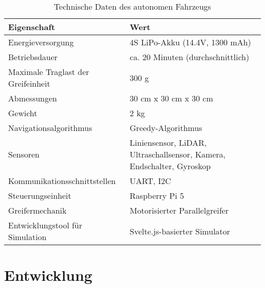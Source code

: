 \documentclass[main.tex]{subfiles} %
\begin{document}
\begin{table}[H]
    \centering
    \renewcommand{\arraystretch}{1.5}
    \begin{tabular}{|l|p{7cm}|}
        \hline
        \textbf{Eigenschaft}               & \textbf{Wert}                                                             \\ \hline
        Energieversorgung                  & 4S LiPo-Akku (14.4V, 1300 mAh)                                            \\ \hline
        Betriebsdauer                      & ca. 20 Minuten (durchschnittlich)                                         \\ \hline
        Maximale Traglast der Greifeinheit & 300 g                                                                     \\ \hline %
        Abmessungen                        & 30 cm x 30 cm x 30 cm                                                     \\ \hline
        Gewicht                            & 2 kg                                                                      \\ \hline
        Navigationsalgorithmus             & Greedy-Algorithmus                                                    \\ \hline
        Sensoren                           & Liniensensor, LiDAR, Ultraschallsensor, Kamera, Endschalter, Gyroskop \\ \hline
        Kommunikationsschnittstellen       & UART, I2C                                                                 \\ \hline
        Steuerungseinheit                  & Raspberry Pi 5                                                            \\ \hline %
        Greifermechanik                    & Motorisierter Parallelgreifer                                             \\ \hline
        Entwicklungstool für Simulation    & Svelte.js-basierter Simulator                                             \\ \hline
    \end{tabular}
    \caption{Technische Daten des autonomen Fahrzeugs}
    \label{tab:hardfacts}
\end{table}


\newpage
\section{Entwicklung}


\newpage


\newpage


\newpage
\end{document}
